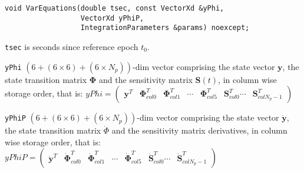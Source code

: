 \begin{lstlisting}
void VarEquations(double tsec, const VectorXd &yPhi,
                  VectorXd yPhiP,
                  IntegrationParameters &params) noexcept;
\end{lstlisting}
\texttt{tsec} is seconds since reference epoch $t_0$.

\texttt{yPhi} $(6+(6 \times 6) + (6 \times N_p) )$-dim vector comprising the 
state vector $\bm{y}$, the state transition matrix $\bm{\Phi}$ and the sensitivity 
matrix $\bm{S}(t)$, in column wise storage order, that is:
$yPhi = \begin{pmatrix}
    \bm{y}^T &  
    \bm{\Phi} ^T _{col0} & \bm{\Phi} ^T _{col1} & \cdots & \bm{\Phi} ^T _{col5} & 
    \bm{S} ^T_{col0} \cdots & \bm{S} ^T_{colN_p-1}
\end{pmatrix}$

\texttt{yPhiP} $(6+(6 \times 6) + (6 \times N_p) )$-dim vector comprising the state vector 
$\dot{\bm{y}}$, the state transition matrix $\dot{\Phi}$ and the sensitivity matrix 
derivatives, in column wise storage order, that is:
$yPhiP = \begin{pmatrix}
    \dot{\bm{y}}^T &  
    \dot{\bm{\Phi}} ^T _{col0} & \dot{\bm{\Phi}} ^T _{col1} & \cdots & \dot{\bm{\Phi}} ^T _{col5} & 
    \dot{\bm{S}} ^T_{col0} \cdots & \dot{\bm{S}} ^T_{colN_p-1}
\end{pmatrix}$

